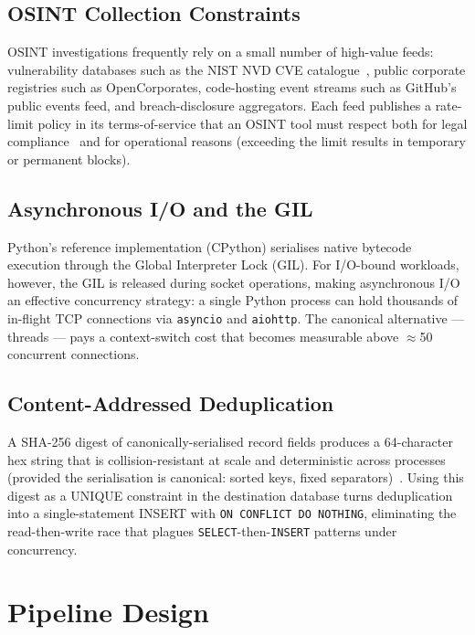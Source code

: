 \documentclass[conference]{IEEEtran}
\begin{document}
\subsection{OSINT Collection Constraints}

OSINT investigations frequently rely on a small number of high-value
feeds: vulnerability databases such as the NIST NVD CVE
catalogue~\cite{nvd2024}, public corporate registries such as
OpenCorporates, code-hosting event streams such as GitHub's public
events feed, and breach-disclosure aggregators. Each feed publishes
a rate-limit policy in its terms-of-service that an OSINT tool must
respect both for legal compliance~\cite{bhutto2024legal} and for
operational reasons (exceeding the limit results in temporary or
permanent blocks).

\subsection{Asynchronous I/O and the GIL}

Python's reference implementation (CPython) serialises native
bytecode execution through the Global Interpreter Lock (GIL). For
I/O-bound workloads, however, the GIL is released during socket
operations, making asynchronous I/O an effective concurrency
strategy: a single Python process can hold thousands of in-flight
TCP connections via \texttt{asyncio} and \texttt{aiohttp}. The
canonical alternative --- threads --- pays a context-switch cost
that becomes measurable above $\approx$50 concurrent connections.

\subsection{Content-Addressed Deduplication}

A SHA-256 digest of canonically-serialised record fields produces
a 64-character hex string that is collision-resistant at scale and
deterministic across processes (provided the serialisation is
canonical: sorted keys, fixed separators)~\cite{rfc6234}. Using
this digest as a UNIQUE constraint in the destination database
turns deduplication into a single-statement INSERT with
\texttt{ON CONFLICT DO NOTHING}, eliminating the
read-then-write race that plagues \texttt{SELECT}-then-\texttt{INSERT}
patterns under concurrency.

\section{Pipeline Design}
\label{sec:design}
\end{document}
